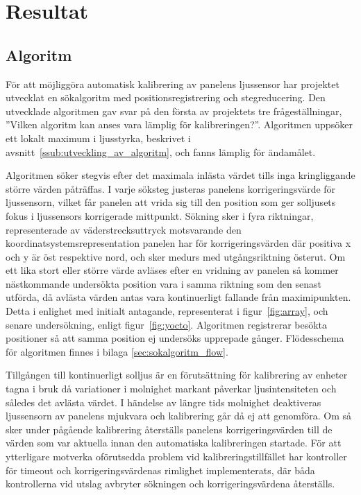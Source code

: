 \section{Resultat} %
\label{sec:resultat}
    \subsection{Algoritm} %
    \label{sub:algoritm}
        För att möjliggöra automatisk kalibrering av panelens ljussensor har projektet utvecklat en sökalgoritm med positionsregistrering och stegreducering. Den utvecklade algoritmen gav svar på den första av projektets tre frågeställningar, ''Vilken algoritm kan anses vara lämplig för kalibreringen?''. Algoritmen uppsöker ett lokalt maximum i ljusstyrka, beskrivet i avsnitt~\ref{ssub:utveckling_av_algoritm}, och fanns lämplig för ändamålet.\bigskip

        Algoritmen söker stegvis efter det maximala inlästa värdet tills inga kringliggande större värden påträffas. I varje söksteg justeras panelens korrigeringsvärde för ljussensorn, vilket får panelen att vrida sig till den position som ger solljusets fokus i ljussensors korrigerade mittpunkt. Sökning sker i fyra riktningar, representerade av väderstrecksuttryck motsvarande den koordinatsystemsrepresentation panelen har för korrigeringsvärden där positiva x och y är öst respektive nord, och sker medurs med utgångsriktning österut. Om ett lika stort eller större värde avläses efter en vridning av panelen så kommer nästkommande undersökta position vara i samma riktning som den senast utförda, då avlästa värden antas vara kontinuerligt fallande från maximipunkten. Detta i enlighet med initialt antagande, representerat i figur~\ref{fig:array}, och senare undersökning, enligt figur~\ref{fig:yocto}. Algoritmen registrerar besökta positioner så att samma position ej undersöks upprepade gånger. Flödesschema för algoritmen finnes i bilaga \ref{sec:sokalgoritm_flow}. \bigskip

        Tillgången till kontinuerligt solljus är en förutsättning för kalibrering av enheter tagna i bruk då variationer i molnighet markant påverkar ljusintensiteten och således det avlästa värdet. I händelse av längre tids molnighet deaktiveras ljussensorn av panelens mjukvara och kalibrering går då ej att genomföra. Om så sker under pågående kalibrering återställs panelens korrigeringsvärden till de värden som var aktuella innan den automatiska kalibreringen startade. För att ytterligare motverka oförutsedda problem vid kalibreringstillfället har kontroller för timeout och korrigeringsvärdenas rimlighet implementerats, där båda kontrollerna vid utslag avbryter sökningen och korrigeringsvärdena återställs.

